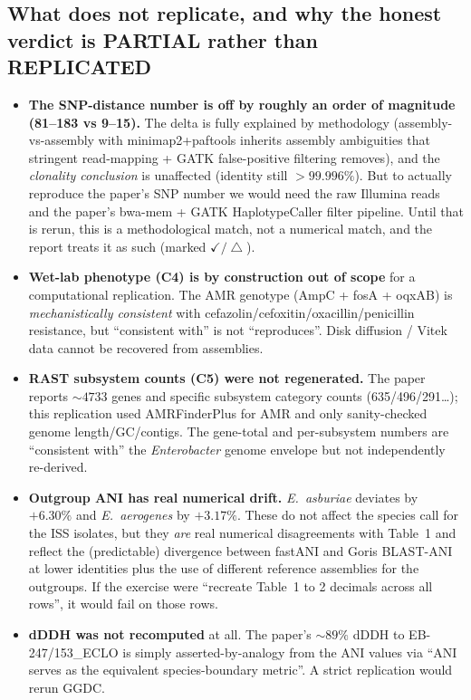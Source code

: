 \documentclass[11pt]{article}
\begin{document}
\subsection*{What does not replicate, and why the honest verdict is PARTIAL rather than REPLICATED}
\begin{itemize}[leftmargin=1.3em]
  \item \textbf{The SNP-distance number is off by roughly an order of magnitude
        (81--183 vs 9--15).} The delta is fully explained by methodology (assembly-vs-assembly
        with minimap2+paftools inherits assembly ambiguities that stringent read-mapping +
        GATK false-positive filtering removes), and the \emph{clonality conclusion} is unaffected
        (identity still ${>}99.996\%$). But to actually reproduce the paper's SNP number we
        would need the raw Illumina reads and the paper's bwa-mem + GATK HaplotypeCaller
        filter pipeline. Until that is rerun, this is a methodological match, not a numerical
        match, and the report treats it as such (marked $\checkmark/\!\!\bigtriangleup$).
  \item \textbf{Wet-lab phenotype (C4) is by construction out of scope} for a computational
        replication. The AMR genotype (AmpC + fosA + oqxAB) is \emph{mechanistically consistent}
        with cefazolin/cefoxitin/oxacillin/penicillin resistance, but ``consistent with'' is not
        ``reproduces''. Disk diffusion / Vitek data cannot be recovered from assemblies.
  \item \textbf{RAST subsystem counts (C5) were not regenerated.} The paper reports ${\sim}4733$ genes
        and specific subsystem category counts (635/496/291\ldots); this replication used
        AMRFinderPlus for AMR and only sanity-checked genome length/GC/contigs. The gene-total
        and per-subsystem numbers are ``consistent with'' the \textit{Enterobacter} genome
        envelope but not independently re-derived.
  \item \textbf{Outgroup ANI has real numerical drift.} \textit{E.~asburiae} deviates by $+6.30\%$
        and \textit{E.~aerogenes} by $+3.17\%$. These do not affect the species call for the ISS
        isolates, but they \emph{are} real numerical disagreements with Table~1 and reflect the
        (predictable) divergence between fastANI and Goris BLAST-ANI at lower identities plus
        the use of different reference assemblies for the outgroups. If the exercise were
        ``recreate Table~1 to 2 decimals across all rows'', it would fail on those rows.
  \item \textbf{dDDH was not recomputed} at all. The paper's ${\sim}89\%$ dDDH to EB-247/153\_ECLO
        is simply asserted-by-analogy from the ANI values via ``ANI serves as the equivalent
        species-boundary metric''. A strict replication would rerun GGDC.
\end{itemize}
\end{document}
